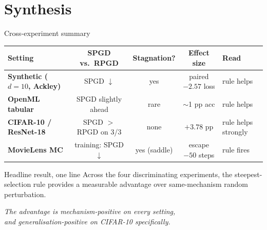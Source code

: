 \documentclass[11pt,aspectratio=169]{beamer}
\begin{document}

\section{Synthesis}

\begin{frame}{Cross-experiment summary}
  \footnotesize
  \begin{tabular}{>{\bfseries}l c c c l}
    \toprule
    \textbf{Setting} & \textbf{SPGD vs.\ RPGD} & \textbf{Stagnation?} &
    \textbf{Effect size} & \textbf{Read} \\
    \midrule
    Synthetic ($d{=}10$, Ackley) & SPGD $\downarrow$ & yes & paired $-2.57$ loss & rule helps \\
    OpenML tabular               & SPGD slightly ahead & rare & $\sim$1 pp acc & rule helps \\
    \alert{CIFAR-10 / ResNet-18} & \alert{SPGD $>$ RPGD on 3/3} & \alert{none} & \alert{$+3.78$ pp} & \alert{rule helps strongly} \\
    MovieLens MC                 & training: SPGD $\downarrow$ & yes (saddle) & escape $-50$ steps & rule fires \\
    \bottomrule
  \end{tabular}

  \vspace{0.7em}
  \begin{block}{Headline result, one line}
    Across the four discriminating experiments, the
    \alert{steepest-selection rule} provides a measurable advantage over
    same-mechanism random perturbation.
  \end{block}

  \pause
  \vspace{0.4em}
  \emph{The advantage is mechanism-positive on every setting,\\
        and generalisation-positive on CIFAR-10 specifically.}
\end{frame}
\end{document}
